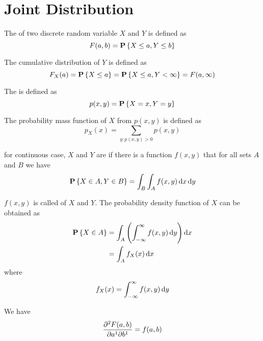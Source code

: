 \section{Joint Distribution}

\begin{definition}
    The  of two discrete random variable $X$ and $Y$ is defined as
    \begin{equation}
        F(a,b) = \mathop{\bf P\/}\displaystyle \left\{ X \leq a, Y \leq b \right\}
    \end{equation}
    
    The cumulative distribution of $Y$ is defined as
    \begin{equation}
        F_X(a) = \mathop{\bf P\/}\displaystyle \left\{X \leq a \right\} =\mathop{\bf P\/}\displaystyle \left\{X \leq a, Y < \infty \right\} = F(a, \infty)
    \end{equation}
    
    The  is defined as 
    \begin{equation}
        p(x,y) =\mathop{\bf P\/}\displaystyle \left\{X = x, Y = y\right\}
    \end{equation}
    
    The probability mass function of $X$ from $p(x,y)$ is defined as
    \begin{equation}
        p_X(x) = \displaystyle \sum_{y: p(x,y) > 0} p(x,y)
    \end{equation}
\end{definition}


\begin{definition}
    for continuous case, $X$ and $Y$ are  if there is a function $f(x,y)$ that for all sets $A$ and $B$ we have 
\begin{equation}
    \probability{X \in A, Y \in B} = \int_B \int_A f(x,y) \dif{x} \dif{y}
\end{equation}

$f(x,y)$ is called  of $X$ and $Y$. The probability density function of $X$ can be obtained as
\begin{equation}
    \begin{aligned}
        \probability{X \in A} &= \int_A \left( \int_{-\infty}^\infty f(x,y) \dif{y} \right) \dif{x}  \\
        &= \int_A f_X (x) \dif{x}
    \end{aligned}
\end{equation}
where
\begin{equation}
     f_X(x) = \int_{-\infty}^\infty f(x,y) \dif{y}
\end{equation}

We have 
\begin{equation}
    \dmd{F(a,b)}{2}{a}{1}{b}{1} = f(a,b)
\end{equation}
\end{definition}

